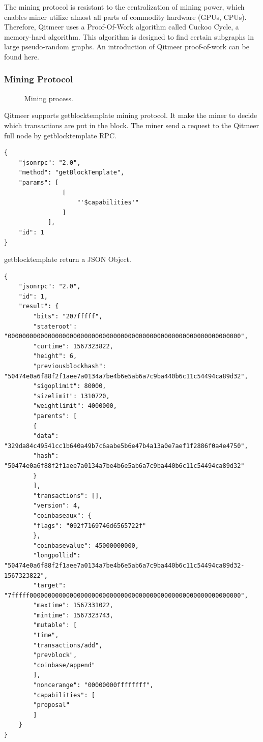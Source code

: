 \documentclass[a4paper,11pt]{article}
\begin{document}
The mining protocol is resistant to the centralization of mining power, which enables miner utilize almost all parts of commodity hardware (GPUs, CPUs).
Therefore, Qitmeer uses a Proof-Of-Work algorithm called Cuckoo Cycle\cite{cuckoocycle},
a memory-hard algorithm. This algorithm is designed to find certain subgraphs in large pseudo-random graphs.
An introduction of Qitmeer proof-of-work can be found here.\cite{qitmeerpow}

\subsubsection{Mining Protocol}

\begin{figure}[ht]
	\centerline{%
	}
	\caption{Mining process.}
\end{figure}

Qitmeer supports getblocktemplate mining protocol. It make the miner to decide which transactions are put in the block. The miner send a request to the Qitmeer full node by getblocktemplate RPC.
\begin{lstlisting}
{
	"jsonrpc": "2.0",
	"method": "getBlockTemplate",
	"params": [
				[
					"'$capabilities'"
				]
			],
	"id": 1
}
\end{lstlisting}
getblocktemplate return a JSON Object.
\begin{lstlisting}
{
	"jsonrpc": "2.0",
	"id": 1,
	"result": {
		"bits": "207fffff",
		"stateroot": "0000000000000000000000000000000000000000000000000000000000000000",
		"curtime": 1567323822,
		"height": 6,
		"previousblockhash": "50474e0a6f88f2f1aee7a0134a7be4b6e5ab6a7c9ba440b6c11c54494ca89d32",
		"sigoplimit": 80000,
		"sizelimit": 1310720,
		"weightlimit": 4000000,
		"parents": [
		{
		"data": "329da84c49541cc1b640a49b7c6aabe5b6e47b4a13a0e7aef1f2886f0a4e4750",
		"hash": "50474e0a6f88f2f1aee7a0134a7be4b6e5ab6a7c9ba440b6c11c54494ca89d32"
		}
		],
		"transactions": [],
		"version": 4,
		"coinbaseaux": {
		"flags": "092f7169746d6565722f"
		},
		"coinbasevalue": 45000000000,
		"longpollid": "50474e0a6f88f2f1aee7a0134a7be4b6e5ab6a7c9ba440b6c11c54494ca89d32-1567323822",
		"target": "7fffff0000000000000000000000000000000000000000000000000000000000",
		"maxtime": 1567331022,
		"mintime": 1567323743,
		"mutable": [
		"time",
		"transactions/add",
		"prevblock",
		"coinbase/append"
		],
		"noncerange": "00000000ffffffff",
		"capabilities": [
		"proposal"
		]
	}
}
\end{lstlisting}
\end{document}
